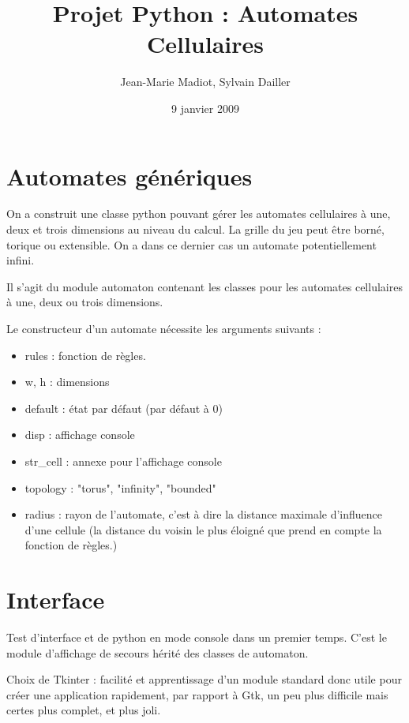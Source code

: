\documentclass[a4paper]{article}
\title{Projet Python : Automates Cellulaires}
\author{Jean-Marie Madiot, Sylvain Dailler}
\date{9 janvier 2009}
\begin{document}
\maketitle{}

\section{Automates génériques}

On a construit une classe python pouvant gérer les automates cellulaires à une, deux et trois dimensions au niveau du calcul. La grille du jeu peut être borné, torique ou extensible. On a dans ce dernier cas un automate potentiellement infini.

Il s'agit du module automaton contenant les classes pour les automates cellulaires à une, deux ou trois dimensions.

Le constructeur d'un automate nécessite les arguments suivants :

\begin{itemize}

\item{rules : fonction de règles.}
\item{w, h : dimensions}
\item{default : état par défaut (par défaut à 0)}
\item{disp : affichage console}
\item{str_cell : annexe pour l'affichage console}
\item{topology : "torus", "infinity", "bounded"}
\item{radius : rayon de l'automate, c'est à dire la distance maximale d'influence d'une cellule (la distance du voisin le plus éloigné que prend en compte la fonction de règles.)}

\end{itemize}

\section{Interface}

Test d'interface et de python en mode console dans un premier temps. C'est le module d'affichage de secours hérité des classes de automaton.

Choix de Tkinter : facilité et apprentissage d'un module standard donc utile pour créer une application rapidement, par rapport à Gtk, un peu plus difficile mais certes plus complet, et plus joli.
\end{document}
